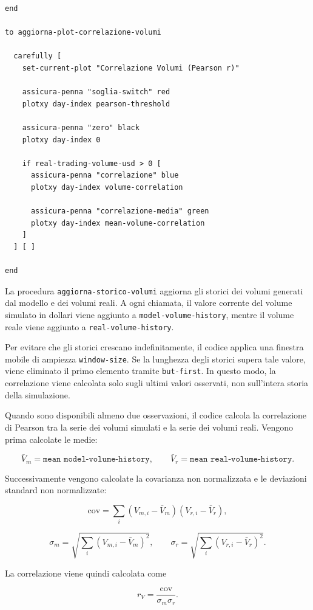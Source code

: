 \begin{lstlisting}[caption={Calcolo della correlazione di Pearson sui volumi e aggiornamento del relativo plot}]
end

to aggiorna-plot-correlazione-volumi

  carefully [
    set-current-plot "Correlazione Volumi (Pearson r)"

    assicura-penna "soglia-switch" red
    plotxy day-index pearson-threshold

    assicura-penna "zero" black
    plotxy day-index 0

    if real-trading-volume-usd > 0 [
      assicura-penna "correlazione" blue
      plotxy day-index volume-correlation

      assicura-penna "correlazione-media" green
      plotxy day-index mean-volume-correlation
    ]
  ] [ ]

end
\end{lstlisting}

La procedura \texttt{aggiorna-storico-volumi} aggiorna gli storici dei volumi
generati dal modello e dei volumi reali. A ogni chiamata, il valore corrente del
volume simulato in dollari viene aggiunto a \texttt{model-volume-history}, mentre
il volume reale viene aggiunto a \texttt{real-volume-history}.

Per evitare che gli storici crescano indefinitamente, il codice applica una
finestra mobile di ampiezza \texttt{window-size}. Se la lunghezza degli storici
supera tale valore, viene eliminato il primo elemento tramite \texttt{but-first}.
In questo modo, la correlazione viene calcolata solo sugli ultimi valori
osservati, non sull'intera storia della simulazione.

Quando sono disponibili almeno due osservazioni, il codice calcola la
correlazione di Pearson tra la serie dei volumi simulati e la serie dei volumi
reali. Vengono prima calcolate le medie:

\[
\bar{V}_m = \texttt{mean model-volume-history},
\qquad
\bar{V}_r = \texttt{mean real-volume-history}.
\]

Successivamente vengono calcolate la covarianza non normalizzata e le deviazioni
standard non normalizzate:

\[
\text{cov}
=
\sum_i
\left(
V_{m,i}-\bar{V}_m
\right)
\left(
V_{r,i}-\bar{V}_r
\right),
\]

\[
\sigma_m
=
\sqrt{
\sum_i
\left(
V_{m,i}-\bar{V}_m
\right)^2
},
\qquad
\sigma_r
=
\sqrt{
\sum_i
\left(
V_{r,i}-\bar{V}_r
\right)^2
}.
\]

La correlazione viene quindi calcolata come

\[
r_V =
\frac{\text{cov}}{\sigma_m \sigma_r}.
\]

